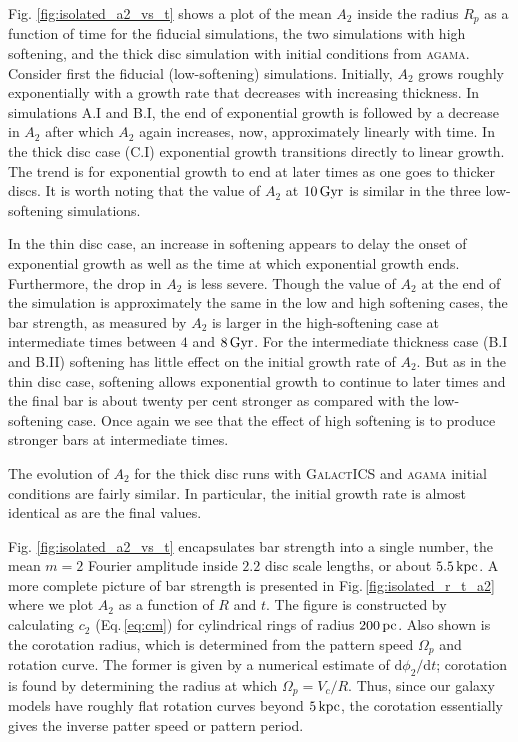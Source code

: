 Fig. \ref{fig:isolated_a2_vs_t} shows a plot of the mean $A_2$ inside
the radius $R_p$ as a function of time for the fiducial simulations,
the two simulations with high softening, and the thick disc simulation
with initial conditions from \textsc{agama}.  Consider first the
fiducial (low-softening) simulations.  Initially, $A_2$ grows roughly
exponentially with a growth rate that decreases with increasing
thickness.  In simulations A.I and B.I, the end of exponential growth
is followed by a decrease in $A_2$ after which $A_2$ again increases,
now, approximately linearly with time.  In the thick disc case (C.I)
exponential growth transitions directly to linear growth.  The trend
is for exponential growth to end at later times as one goes to thicker
discs.  It is worth noting that the value of $A_2$ at $10\,{\rm Gyr}$
is similar in the three low-softening simulations.

In the thin disc case, an increase in softening appears to delay the
onset of exponential growth as well as the time at which exponential
growth ends.  Furthermore, the drop in $A_2$ is less severe.  Though
the value of $A_2$ at the end of the simulation is approximately the
same in the low and high softening cases, the bar strength, as
measured by $A_2$ is larger in the high-softening case at intermediate
times between $4$ and $8\,{\rm Gyr}$.  For the intermediate thickness
case (B.I and B.II) softening has little effect on the initial
growth rate of $A_2$.  But as in the thin disc case, softening
allows exponential growth to continue to later times and the final bar
is about twenty per cent stronger as compared with the low-softening
case.  Once again we see that the effect of high softening is to
produce stronger bars at intermediate times.

The evolution of $A_2$ for the thick disc runs with \textsc{GalactICS}
and \textsc{agama} initial conditions are fairly similar.  In particular,
the initial growth rate is almost identical as are the final values.

Fig. \ref{fig:isolated_a2_vs_t} encapsulates bar strength into a
single number, the mean $m=2$ Fourier amplitude inside $2.2$ disc
scale lengths, or about $5.5\,{\rm kpc}$.  A more complete picture of
bar strength is presented in Fig.\,\ref{fig:isolated_r_t_a2} where we
plot $A_2$ as a function of $R$ and $t$. The figure is constructed by
calculating $c_2$ (Eq.\,\ref{eq:cm}) for cylindrical rings of radius
$200\,{\rm pc}$.  Also shown is the corotation radius, which is
determined from the pattern speed $\Omega_p$ and rotation curve. The
former is given by a numerical estimate of ${\text{d}
  \phi_2}/{\text{d} t}$; corotation is found by determining the radius
at which $\Omega_p = V_c/R$.  Thus, since our galaxy models have
roughly flat rotation curves beyond $5\,{\rm kpc}$, the corotation
essentially gives the inverse patter speed or pattern period.

